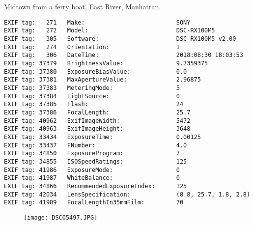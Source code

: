 \section{\protect{}}
\noindent Midtown from a ferry boat, East River, Manhattan.
\noindent
\begin{lstlisting}
EXIF tag:   271   Make:                          SONY
EXIF tag:   272   Model:                         DSC-RX100M5
EXIF tag:   305   Software:                      DSC-RX100M5 v2.00
EXIF tag:   274   Orientation:                   1
EXIF tag:   306   DateTime:                      2018:08:30 18:03:53
EXIF tag: 37379   BrightnessValue:               9.7359375
EXIF tag: 37380   ExposureBiasValue:             0.0
EXIF tag: 37381   MaxApertureValue:              2.96875
EXIF tag: 37383   MeteringMode:                  5
EXIF tag: 37384   LightSource:                   0
EXIF tag: 37385   Flash:                         24
EXIF tag: 37386   FocalLength:                   25.7
EXIF tag: 40962   ExifImageWidth:                5472
EXIF tag: 40963   ExifImageHeight:               3648
EXIF tag: 33434   ExposureTime:                  0.00125
EXIF tag: 33437   FNumber:                       4.0
EXIF tag: 34850   ExposureProgram:               7
EXIF tag: 34855   ISOSpeedRatings:               125
EXIF tag: 41986   ExposureMode:                  0
EXIF tag: 41987   WhiteBalance:                  0
EXIF tag: 34866   RecommendedExposureIndex:      125
EXIF tag: 42034   LensSpecification:             (8.8, 25.7, 1.8, 2.8)
EXIF tag: 41989   FocalLengthIn35mmFilm:         70

\end{lstlisting}
\clearpage
\begin{figure}
\raggedleft
\texttt{[image: DSC05497.JPG]}
\end{figure}


\clearpage
